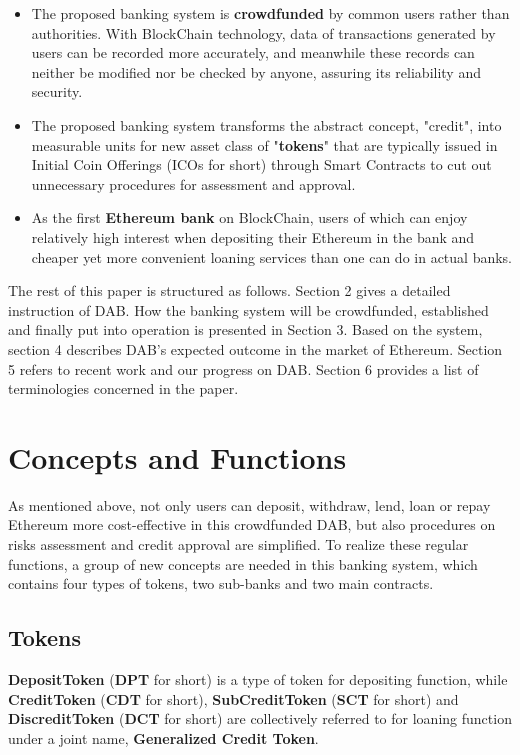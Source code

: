 \documentclass[a4paper, 10pt, conference]{ieeeconf} %
\begin{document}
\begin{itemize}
   \item The proposed banking system is \textbf{crowdfunded} by common users rather than authorities. With BlockChain technology, data of transactions generated by users can be recorded more accurately, and meanwhile these records can neither be modified nor be checked by anyone, assuring its reliability and security.
   \item The proposed banking system transforms the abstract concept, "credit", into measurable units for new asset class of "\textbf{tokens}" that are typically issued in Initial Coin Offerings (ICOs for short) through Smart Contracts to cut out unnecessary procedures for assessment and approval.
   \item As the first \textbf{Ethereum bank} on BlockChain, users of which can enjoy relatively high interest when depositing their Ethereum in the bank and cheaper yet more convenient loaning services than one can do in actual banks.
\end{itemize}

The rest of this paper is structured as follows. Section 2 gives a detailed instruction of DAB. How the banking system will be crowdfunded, established and  finally put into operation is presented in Section 3. Based on the system, section 4 describes DAB's expected outcome in the market of Ethereum. Section 5 refers to recent work and our progress on DAB. Section 6 provides a list of terminologies concerned in the paper.

\section{Concepts and Functions}
As mentioned above, not only users can deposit, withdraw, lend, loan or repay Ethereum more cost-effective in this crowdfunded DAB, but also procedures on risks assessment and credit approval are simplified. To realize these regular functions, a group of new concepts are needed in this banking system, which contains four types of tokens, two sub-banks and two main contracts.

\subsection{Tokens}
\textbf{DepositToken} (\textbf{DPT} for short) is a type of token for depositing function, while \textbf{CreditToken} (\textbf{CDT} for short), \textbf{SubCreditToken} (\textbf{SCT} for short) and \textbf{DiscreditToken} (\textbf{DCT} for short) are collectively referred to for loaning function under a joint name, \textbf{Generalized Credit Token}.
\end{document}
